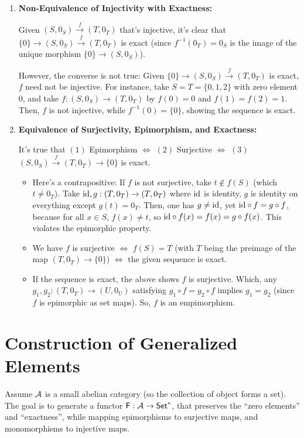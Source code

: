 \documentclass{article}
\begin{document}
\begin{enumerate}
    \hfil

    \item \textbf{Non-Equivalence of Injectivity with Exactness:}
    
    Given $(S,0_S)\xrightarrow{f} (T,0_T)$ that's injective, it's clear that $\{0\}\rightarrow (S,0_S)\xrightarrow{f} (T,0_T)$ is exact (since $f^{-1}(0_T) = {0_S}$ is the image of the unique morphism $\{0\}\rightarrow (S,0_S)$).

    However, the converse is not true: Given $\{0\}\rightarrow (S,0_S)\xrightarrow{f} (T,0_T)$ is exact, $f$ need not be injective. For instance, take $S=T = \{0,1,2\}$ with zero element $0$, and take $f:(S,0_S)\rightarrow (T,0_T)$ by $f(0)=0$ and $f(1)=f(2)=1$. Then, $f$ is not injective, while $f^{-1}(0)=\{0\}$, showing the sequence is exact.

    \hfil

    \item \textbf{Equivalence of Surjectivity, Epimorphism, and Exactness:}
    
    It's true that $(1)$ Epimorphism $\iff$ $(2)$ Surjective $\iff$ $(3)$ $(S,0_S)\xrightarrow{f}(T,0_T)\rightarrow \{0\}$ is exact.

    \begin{itemize}
        \item[$(1)\implies (2)$:] Here's a contrapositive: If $f$ is not surjective, take $t\notin f(S)$ (which $t\neq 0_T$). Take $\mathrm{id}, g:(T,0_T)\rightarrow (T,0_T)$ where $\mathrm{id}$ is identity, $g$ is identity on everything except $g(t)=0_T$. Then, one has $g\neq \mathrm{id}$, yet $\mathrm{id}\circ f=g\circ f$, because for all $x\in S$, $f(x)\neq t$, so $\mathrm{id} \circ f(x)=f(x)=g\circ f(x)$. This violates the epimorphic property.
        
        \item[$(2)\iff (3)$:] We have $f$ is surjective $\iff$ $f(S)=T$ (with $T$ being the preimage of the map $(T,0_T)\rightarrow \{0\}$) $\iff$ the given sequence is exact.
        
        \item[$(3)\implies (1)$:] If the sequence is exact, the above shows $f$ is surjective. Which, any $g_1,g_2:(T,0_T)\rightarrow (U,0_U)$ satisfying $g_1 \circ f=g_2\circ f$ implies $g_1=g_2$ (since $f$ is epimorphic as set maps). So, $f$ is an empimorphism.
    \end{itemize}
\end{enumerate}

\hfil

\section{Construction of Generalized Elements}
Assume $\cal{A}$ is a small abelian category (so the collection of object forms a set). The goal is to generate a functor $\mathsf{F}:\cal{A}\rightarrow \mathsf{Set}^*$, that preserves the ``zero elements'' and ``exactness'', while mapping epimorphisms to surjective maps, and monomorphisms to injective maps.
\end{document}
